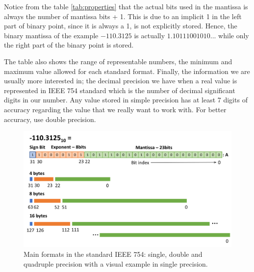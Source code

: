 Notice from the table \ref{tab:properties} that the actual bits used in the mantissa is always the number of mantissa bits + 1. 
This is due to an implicit 1 in the left part of binary point, since it is always a 1, is not explicitly stored. 
Hence, the binary mantissa of the example $-110.3125$ is actually $1.10111001010...$ while only the right part of the binary point is stored. 

The table also shows the range of representable numbers, the minimum and maximum value allowed for each standard format. Finally, the information we are usually more interested in; the decimal precision we have when a real value is represented in IEEE 754 standard which is the number of decimal significant digits in our number. Any value stored in simple precision has at least 7 digits of accuracy regarding the value that we really want to work with. For better accuracy, use double precision. 

\newpage
\begin{figure}
    \centering
    \includegraphics[width= \textwidth]{./doc/Figures/ParametersIEEE.png}
    \caption{Main formats in the standard IEEE 754: single, double and quadruple precision with a visual example in single precision.}
    \label{fig:ParametersIEEE}
\end{figure}


